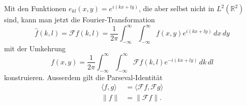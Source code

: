 Mit den Funktionen
\(
e_{kl}(x,y)
=
e^{i(kx+ly)}
\),
die aber selbst nicht in $L^2(\mathbb{R}^2)$ sind,
kann man jetzt die Fourier-Transformation
\begin{equation}
\hat{f}(k,l)
=
\mathscr{F}f(k,l)
=
\frac{1}{2\pi}
\int_{-\infty}^\infty
\int_{-\infty}^\infty
f(x,y) e^{i(kx+ly)}
\,dx\,dy
\label{buch:fourier:eqn:2dtransform}
\end{equation}
mit der Umkehrung
\[
f(x,y)
=
\frac{1}{2\pi}
\int_{-\infty}^\infty
\int_{-\infty}^\infty
\mathscr{F}f(k,l) e^{-i(kx+ly)}
\,dk\,dl
\]
konstruieren.
Ausserdem gilt die Parseval-Identität
%
\begin{align*}
\langle f,g\rangle
&=
\langle \mathscr{F}f,\mathscr{F}g\rangle
\\
\|f\|
&=
\|\mathscr{F}f\|.
\end{align*}



